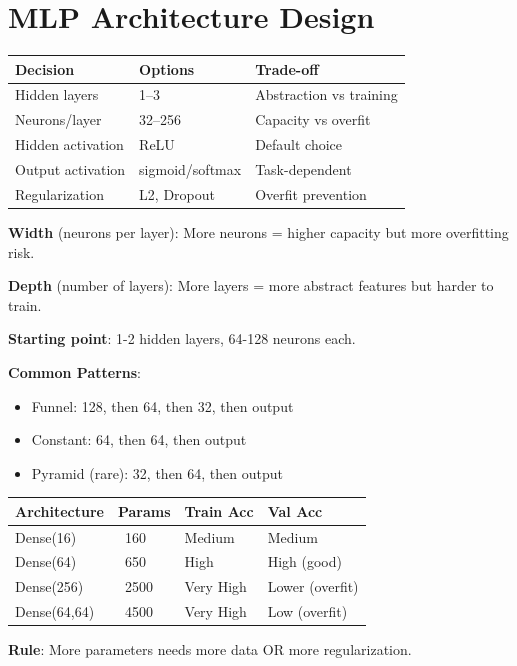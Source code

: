 \documentclass[11pt,a4paper]{article}
\begin{document}
\section{MLP Architecture Design}

\begin{definitionbox}

\begin{tabular}{@{}l|l|l@{}}
\textbf{Decision} & \textbf{Options} & \textbf{Trade-off} \\
\hline
Hidden layers & 1--3 & Abstraction vs training \\
Neurons/layer & 32--256 & Capacity vs overfit \\
Hidden activation & ReLU & Default choice \\
Output activation & sigmoid/softmax & Task-dependent \\
Regularization & L2, Dropout & Overfit prevention \\
\end{tabular}
\end{definitionbox}

\begin{notebox}

\textbf{Width} (neurons per layer): More neurons = higher capacity but more overfitting risk.

\textbf{Depth} (number of layers): More layers = more abstract features but harder to train.

\textbf{Starting point}: 1-2 hidden layers, 64-128 neurons each.

\textbf{Common Patterns}:
\begin{itemize}[leftmargin=*,nosep]
\item Funnel: 128, then 64, then 32, then output
\item Constant: 64, then 64, then output
\item Pyramid (rare): 32, then 64, then output
\end{itemize}
\end{notebox}

\begin{examplebox}

\begin{tabular}{@{}l|l|l|l@{}}
\textbf{Architecture} & \textbf{Params} & \textbf{Train Acc} & \textbf{Val Acc} \\
\hline
Dense(16) & ~160 & Medium & Medium \\
Dense(64) & ~650 & High & High (good) \\
Dense(256) & ~2500 & Very High & Lower (overfit) \\
Dense(64,64) & ~4500 & Very High & Low (overfit) \\
\end{tabular}

\textbf{Rule}: More parameters needs more data OR more regularization.
\end{examplebox}
\end{document}
